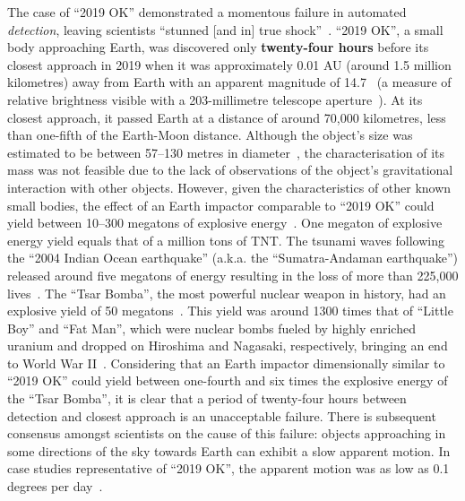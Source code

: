 The case of ``2019 OK'' demonstrated a momentous failure in automated \textit{detection}, leaving scientists ``stunned [and in] true shock''~\cite{chiu_2019}. ``2019 OK'', a small body approaching Earth, was discovered only \textbf{twenty-four hours} before its closest approach in 2019 when it was approximately 0.01 AU (around 1.5 million kilometres) away from Earth with an apparent magnitude of 14.7~\cite{IAU2019OK} (a measure of relative brightness visible with a 203-millimetre telescope aperture~\cite[p.~24]{North2014}). At its closest approach, it passed Earth at a distance of around 70,000 kilometres, less than one-fifth of the Earth-Moon distance. Although the object's size was estimated to be between 57--130 metres in diameter~\cite{NASA2019}, the characterisation of its mass was not feasible due to the lack of observations of the object's gravitational interaction with other objects. However, given the characteristics of other known small bodies, the effect of an Earth impactor comparable to ``2019 OK'' could yield between 10--300 megatons of explosive energy~\cite{Cellino1999, Rumpf2017}. One megaton of explosive energy yield equals that of a million tons of \gls{TNT}. The tsunami waves following the ``2004 Indian Ocean earthquake'' (a.k.a. the ``Sumatra-Andaman earthquake'') released around five megatons of energy resulting in the loss of more than 225,000 lives~\cite{Nirupama2006}. The ``Tsar Bomba'', the most powerful nuclear weapon in history, had an explosive yield of 50 megatons~\cite{Khan2020}. This yield was around 1300 times that of ``Little Boy'' and ``Fat Man'', which were nuclear bombs fueled by highly enriched uranium and dropped on Hiroshima and Nagasaki, respectively, bringing an end to World War II~\cite{malik1985}. Considering that an Earth impactor dimensionally similar to ``2019 OK'' could yield between one-fourth and six times the explosive energy of the ``Tsar Bomba'', it is clear that a period of twenty-four hours between detection and closest approach is an unacceptable failure. There is subsequent consensus amongst scientists on the cause of this failure: objects approaching in some directions of the sky towards Earth can exhibit a slow apparent motion. In case studies representative of ``2019 OK'', the apparent motion was as low as 0.1 degrees per day~\cite{Wainscoat2022}.

